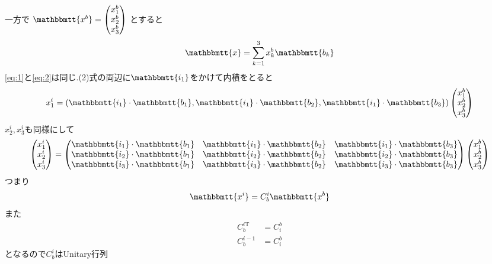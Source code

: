 \documentclass[class=article, crop=false, preview=false, dvipdfmx, a4paper]{standalone}
\begin{document}
一方で
$\mathbbmtt{x^b}=
    \begin{pmatrix}
    	x^b_1\\
        x^b_2\\
        x^b_3\\
    \end{pmatrix}$
とすると
\begin{equation}
\mathbbmtt{x} = \sum_{k=1}^{3} x^b_k \mathbbmtt{b_k}  \label{eq:2}
\end{equation}
\eqref{eq:1}と\eqref{eq:2}は同じ.(2)式の両辺に$\mathbbmtt{i_1}$をかけて内積をとると
\[ x^i_1 =
	\left(
		\mathbbmtt{i_1} \cdot \mathbbmtt{b_1},
        \mathbbmtt{i_1} \cdot \mathbbmtt{b_2},
        \mathbbmtt{i_1} \cdot \mathbbmtt{b_3}
    \right)
	\begin{pmatrix}
    	x^b_1\\
        x^b_2\\
        x^b_3\\
    \end{pmatrix}
\]
$x^i_2, x^i_3$も同様にして
\[
\begin{pmatrix}
	x^i_1\\
    x^i_2\\
    x^i_3\\
\end{pmatrix}
=
\begin{pmatrix}
	\mathbbmtt{i_1} \cdot \mathbbmtt{b_1} & 
    \mathbbmtt{i_1} \cdot \mathbbmtt{b_2} & 
    \mathbbmtt{i_1} \cdot \mathbbmtt{b_3} \\
    \mathbbmtt{i_2} \cdot \mathbbmtt{b_1} &
    \mathbbmtt{i_2} \cdot \mathbbmtt{b_2} &
    \mathbbmtt{i_2} \cdot \mathbbmtt{b_3} \\
    \mathbbmtt{i_3} \cdot \mathbbmtt{b_1} & 
    \mathbbmtt{i_3} \cdot \mathbbmtt{b_2} & 
    \mathbbmtt{i_3} \cdot \mathbbmtt{b_3}
\end{pmatrix}
\begin{pmatrix}
	x^b_1\\
    x^b_2\\
    x^b_3\\
\end{pmatrix}
\]
つまり
\[ \mathbbmtt{x^i} = C^i_b\mathbbmtt{x^b} \]
また
\begin{align}
C_b^{i\mathrm{T}} & = C_i^b \\
C_b^{i-1} & = C^b_i
\end{align}
となるので$C_b^i$はUnitary行列
\end{document}
